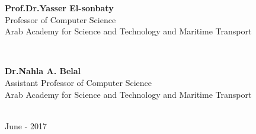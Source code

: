 \documentclass{llncs}
\begin{document}
\begin{titlepage}
\begin{minipage}{0.45\textwidth}
\begin{flushleft}
\center
{\large \bfseries Prof.Dr.Yasser El-sonbaty}\\
{Professor of Computer Science}\\
{Arab Academy for Science and Technology and Maritime Transport}
\end{flushleft}
\end{minipage}
~
\begin{minipage}{0.47\textwidth}
\begin{flushright}
\center
{\large \bfseries Dr.Nahla A. Belal}\\
{Assistant Professor of Computer Science}\\
{Arab Academy for Science and Technology and Maritime Transport}
\end{flushright}
\end{minipage}\\[1cm]
{June - 2017}\\[0.2cm] 
\vfill %
\end{titlepage}
\end{document}
